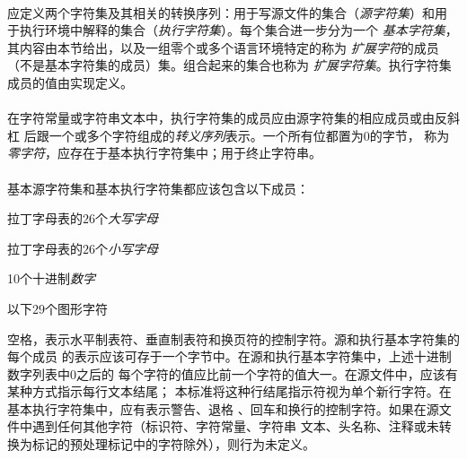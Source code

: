 \paragraph{}
应定义两个字符集及其相关的转换序列：用于写源文件的集合（\textit{源字符集}）和用
于执行环境中解释的集合（\textit{执行字符集}）。每个集合进一步分为一个
\textit{基本字符集}，其内容由本节给出，以及一组零个或多个语言环境特定的称为
\textit{扩展字符}的成员（不是基本字符集的成员）集。组合起来的集合也称为
\textit{扩展字符集}。执行字符集成员的值由实现定义。

\paragraph{}
在字符常量或字符串文本中，执行字符集的成员应由源字符集的相应成员或由反斜杠
\tm{\bs}后跟一个或多个字符组成的\textit{转义序列}表示。一个所有位都置为0的字节，
称为\textit{零字符}，应存在于基本执行字符集中；用于终止字符串。

\paragraph{}
基本源字符集和基本执行字符集都应该包含以下成员：

拉丁字母表的$26$个\textit{大写字母}

\mbox{\qquad{}}

\mbox{\qquad{}}

拉丁字母表的$26$个\textit{小写字母}

\mbox{\qquad{}}

\mbox{\qquad{}}

10个十进制\textit{数字}

\mbox{\qquad{}}

以下$29$个图形字符

\mbox{\qquad{}}

\mbox{\qquad{}}

空格，表示水平制表符、垂直制表符和换页符的控制字符。源和执行基本字符集的每个成员
的表示应该可存于一个字节中。在源和执行基本字符集中，上述十进制数字列表中0之后的
每个字符的值应比前一个字符的值大一。在源文件中，应该有某种方式指示每行文本结尾；
本标准将这种行结尾指示符视为单个新行字符。在基本执行字符集中，应有表示警告、退格
、回车和换行的控制字符。如果在源文件中遇到任何其他字符（标识符、字符常量、字符串
文本、头名称、注释或未转换为标记的预处理标记中的字符除外），则行为未定义。

